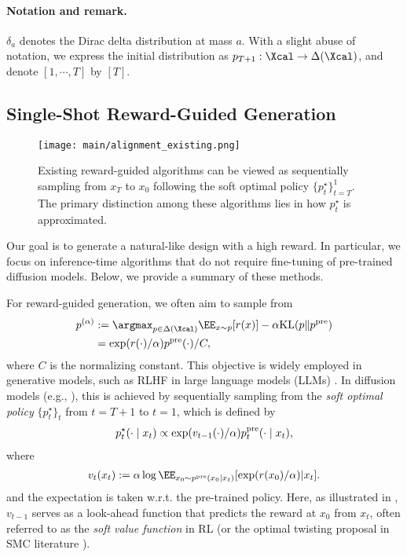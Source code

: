 \vspace{-2mm}
\paragraph{Notation and remark.} $\delta_{a}$ denotes the Dirac delta distribution at mass $a$. With a slight abuse of notation, we express the initial distribution as $p_{T+1}:\Xcal \to \Delta(\Xcal)$, and denote   $[1,\cdots,T]$ by $[T]$. 


\subsection{Single-Shot Reward-Guided Generation} \label{sec:existing}

\begin{figure}[!t]
    \centering
    \texttt{[image: main/alignment\_existing.png]}
    \caption{Existing reward-guided algorithms can be viewed as sequentially sampling from $x_T$ to $x_0$ following the soft optimal policy $\{p^{\star}_t\}_{t=T}^1$. The primary distinction among these algorithms lies in how $p^{\star}_t$ is approximated. }
    \label{fig:existing}
\end{figure}

Our goal is to generate a natural-like design with a high reward. In particular, we focus on inference-time algorithms that do not require fine-tuning of pre-trained diffusion models. Below, we provide a summary of these methods.

For reward-guided generation, we often aim to sample from
\begin{align}\label{eq:goal}
    p^{(\alpha)}&:=\argmax_{p\in \Delta(\Xcal) } \EE_{x\sim p}[r(x)]- \alpha \KL(p \| p^{\pre}) \\ 
    &= \exp(r(\cdot)/\alpha)p^{\pre}(\cdot)/C, \nonumber
\end{align}
where $C$ is the normalizing constant. This objective is widely employed in generative models, such as RLHF in large language models (LLMs) \citep{ziegler2019fine,ouyang2022training}. In diffusion models (e.g., \citet[Theorem 1]{uehara2024fine}), this is achieved by sequentially sampling from the \emph{soft optimal policy} $\{p^{\star}_{t}\}_t$ from $t=T+1$ to $t=1$, which is defined by 
\begin{align*}
    p^{\star}_{t}(\cdot \mid x_{t}) \propto \exp(v_{t-1}(\cdot)/\alpha)p^{\mathrm{pre}}_{t}(\cdot \mid x_{t}), 
\end{align*}
where 
\begin{align}\label{eq:value}
    v_{t}(x_{t}):=\alpha \log \EE_{x_0\sim p^{\pre}(x_0\mid x_{t})}[\exp(r(x_0)/\alpha)|x_{t}].
\end{align}
and the expectation is taken w.r.t. the pre-trained policy. Here, as illustrated in , $v_{t-1}$ serves as a look-ahead function that predicts the reward at $x_0$ from $x_t$, often referred to as the \emph{soft value function} in RL (or the optimal twisting proposal in SMC literature \citep{naesseth2019elements}). 

